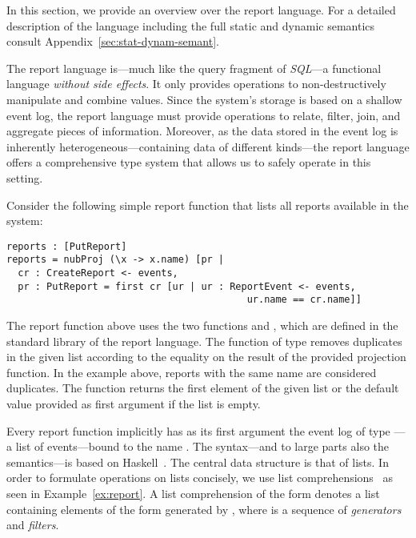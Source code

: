 In this section, we provide an overview over the report
language. For a detailed description of the language including the
full static and dynamic semantics consult
Appendix~\ref{sec:stat-dynam-semant}.

The report language is---much like the query fragment of
\emph{SQL}---a functional language \emph{without side effects}. It
only provides operations to non-destructively manipulate and combine
values. Since the system's storage is based on a shallow event log, the report
language must provide operations to relate, filter, join, and aggregate
pieces of information. Moreover, as the data stored in the event log
is inherently heterogeneous---containing data of different kinds---the
report language offers a comprehensive type system that allows us
to safely operate in this setting.

\begin{example}
\label{ex:report}
Consider the following simple report function that lists all reports
available in the system:
\begin{lstlisting}[language=parrot,basicstyle=\normalsize]
reports : [PutReport]
reports = nubProj (\x -> x.name) [pr |
  cr : CreateReport <- events,
  pr : PutReport = first cr [ur | ur : ReportEvent <- events,
                                          ur.name == cr.name]]
\end{lstlisting}
The report function above uses the two functions  and
, which are defined in the standard library of the report
language. The function  of type  removes duplicates in the given list according to the
equality on the result of the provided projection function. In the
example above, reports with the same name are considered
duplicates. The function  returns the first
element of the given list or the default value provided as first
argument if the list is empty.
\end{example}

Every report function implicitly has as its first argument the event
log of type \prt{[Event]}---a list of events---bound to the name
. The syntax---and to large parts also the semantics---is
based on Haskell~\cite{marlow10haskell}.  The central data structure
is that of lists. In order to formulate operations on lists concisely,
we use list comprehensions~\cite{wadler92mscs} as seen in
Example~\ref{ex:report}. A list comprehension of the form \prt{[ e | c
  ]} denotes a list containing elements of the form  generated
by , where  is a sequence of \emph{generators} and
\emph{filters}.

